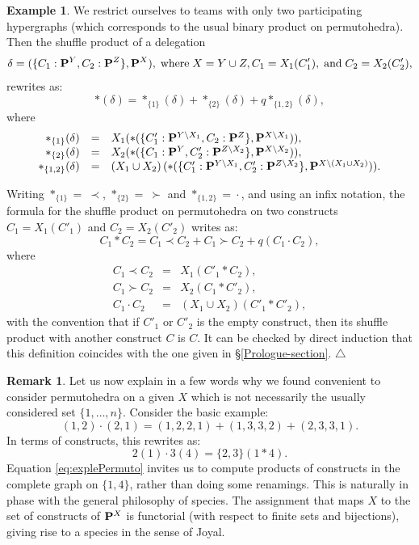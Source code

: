 \documentclass[11pt]{article}
\theoremstyle{definition}
\newtheorem{remark}[theo]{Remark}
\newtheorem{example}[theo]{Example}
\numberwithin{equation}{section}
\numberwithin{equation}{section}
\newcommand\xqed[1]{%
  \leavevmode\unskip\penalty9999 \hbox{}\nobreak\hfill
  \quad\hbox{#1}}
\newcommand\demo{\xqed{$\triangle$}}
\newcommand{\set}[1]{\{#1\}}
\newcommand{\hyper}[1]{{\bf #1}}
\newcommand{\bcdot}{\,{\bm \cdot}\,}
\begin{document}
\begin{example} \label{permutohedra- }
We restrict ourselves to teams with only two participating hypergraphs (which corresponds to the usual binary product on permutohedra). Then 
the   shuffle product of a delegation $$\delta=(\{C_1 : \hyper{P}^Y, C_2 :\hyper{P}^Z\},\hyper{P}^X),\;\mbox{where}\; X=Y \cup Z,
C_1=X_1(C'_1),\; \mbox{and}\; C_2=X_2(C'_2),$$
rewrites as:
$$\ast(\delta) = \ast_{\{1\}}(\delta) + \ast_{\{2\}}(\delta)+q\ast_{\{1,2\}}(\delta),$$ where
$$\begin{array}{rcl}
\ast_{\{1\}}(\delta) &=&X_1(\ast(\{C'_1 : \hyper{P}^{Y \backslash X_1}, C_2 : \hyper{P}^Z\}, \hyper{P}^{X \backslash X_1})), \\
\ast_{\{2\}}(\delta) &=& X_2(\ast(\{C_1 : \hyper{P}^{Y }, C'_2 : \hyper{P}^{Z \backslash X_2}\}, \hyper{P}^{X \backslash X_2})),\\
\ast_{\{1,2\}}(\delta) &=&\left(X_1 \cup X_2 \right)(\ast(\{C'_1 : \hyper{P}^{Y \backslash X_1}, C'_2 : \hyper{P}^{Z \backslash X_2}\}, \hyper{P}^{X \backslash \left(X_1 \cup X_2 \right)})).
\end{array}$$

 Writing $\ast_{\{1\}}\!=\:\prec$, $\ast_{\{2\}}\!=\:\succ$ and $\ast_{\{1,2\}}\!=\!\bcdot$, and using an infix notation, the formula for the   shuffle product on permutohedra  on two constructs $C_1=X_1(C'_1)$ and $C_2=X_2(C'_2)$ writes as:
$$C_1 \ast C_2 = C_1 \prec C_2+C_1 \succ C_2+q (C_1 \bcdot C_2),$$ where
$$\begin{array}{rcl}
C_1 \prec C_2 &=&X_1(C'_1 \ast  C_2 ), \\
C_1 \succ C_2 &=&X_2(C_1 \ast C'_2),\\
C_1 \bcdot C_2&=&\left(X_1 \cup X_2 \right)(C'_1 \ast C'_2),
\end{array}$$
with the convention that if $C'_1$ or $C'_2$ is the empty construct, then its   shuffle product with another  construct $C$ is $C$. It can be checked by direct induction that this  definition coincides with the one given in  \S\ref{Prologue-section}. \demo

\end{example}


\begin{remark} \label{species-remark}
 Let us now explain in a few words why we found convenient to consider permutohedra on a given $X$ which is not necessarily  the usually considered set $\set{1,\ldots,n}$.  
 Consider the basic example:
\begin{equation}
(1,2)\bcdot (2,1) = (1,2,2,1)+ (1,3,3,2) + (2,3,3,1).
\end{equation}
In terms of constructs, this rewrites as:
\begin{equation} \label{eq:explePermuto}
2(1)\bcdot 3(4) = \{2,3\} (1 \ast 4).
\end{equation}
 Equation \ref{eq:explePermuto} invites us to compute products of constructs in the complete graph on $\{1,4\}$, rather than doing some renamings.
 This  is naturally in phase with the general philosophy of species. The assignment that maps $X$ to the set of constructs of $\hyper{P}^X$
 is functorial (with respect to finite sets and bijections), giving rise to a species in the sense of Joyal. 
 \end{remark}
\end{document}
